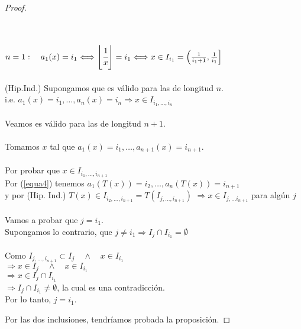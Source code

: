 \begin{proof}
\begin{itemize}
    \\
    \\
    $n=1: \quad a_{1}(x)=i_{1} \Longleftrightarrow \left\lfloor\cfrac{1}{x}\right\rfloor=i_{1} \Longleftrightarrow x \in I_{i_{1}}=\left(\frac{1}{i_{1}+1}, \frac{1}{i_{1}}\right]$
    \\
    \\
    (Hip.Ind.) Supongamos que es válido para las de longitud $n$.
    \\
    i.e. $a_{1}(x)=i_{1}, \ldots, a_{n}(x)=i_{n} \Rightarrow x \in I_{i_{1}, \ldots, i_{n}}$
    \\
    \\
    Veamos es válido para las de longitud $n+1$.
    \\
    \\
    Tomamos $x$ tal que $a_{1}(x)=i_{1}, \ldots, a_{n+1}(x)=i_{n+1} .$
    \\
    \\
    Por probar que $x \in I_{i_{1}, \ldots, i_{n+1}}$
    \\
    Por (\ref{equa4}) tenemos $a_{1}(T(x))=i_{2}, \ldots, a_{n}(T(x))=i_{n+1}$
    \\
    y por (Hip. Ind.) $T(x) \in I_{i_{2}, \ldots, i_{n+1}}=T\left(I_{j, \ldots, i_{n+1}}\right)$
    $\Rightarrow x \in I_{j, \ldots i_{n+1}}$ para algún $j$
    \\
    \\
    Vamos a probar que $j=i_{1}$. \\
    Supongamos lo contrario, que $j \neq i_{1} \Rightarrow I_{j} \cap I_{i_{1}}=\emptyset$
    \\
    \\
    Como $ I_{j, \ldots, i_{n+1}}\subset I_{j} \quad \wedge \quad x \in I_{i_{1}}$
    \\
    $\Rightarrow x \in I_{j}\quad \wedge \quad x \in I_{i_{1}}$
    \\
    $\Rightarrow x\in I_{j}\cap I_{i_{1}}$
    \\
    $\Rightarrow I_{j}\cap I_{i_{1}}\neq\emptyset$, la cual es una contradicción.
    \\
    Por lo tanto, $j=i_{1}$.

\end{itemize}
Por las dos inclusiones, tendríamos probada la proposición. 
\end{proof}

